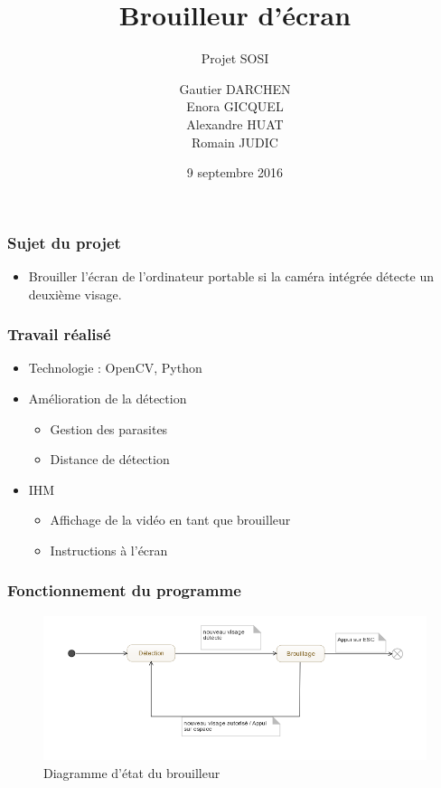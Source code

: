 \documentclass{beamer}
\title[Brouilleur d'écran (Projet SOSI)]{Brouilleur d'écran}
\subtitle{Projet SOSI}
\author[GD \-- EG \-- AH \-- RJ (ASI4)]{Gautier DARCHEN \\ Enora GICQUEL \\ Alexandre HUAT \\ Romain JUDIC}
\institute[]{INSA Rouen ASI4}
\date{9 septembre 2016}
\newif\ifplacelogo
\begin{document}
\placelogotrue	%

	\begin{frame}
	\titlepage
	\end{frame}
	
	
	\begin{frame}
	\frametitle{Sujet du projet}
	\begin{alertblock}{}
   	\rightskip=0pt\leftskip=0pt
	\begin{itemize}
	\item \og Brouiller l'écran de l'ordinateur portable si la caméra intégrée détecte un deuxième visage. \fg
	\end{itemize}
	\end{alertblock}
	\end{frame}
	
	\begin{frame}
	\frametitle{Travail réalisé}
	\begin{alertblock}{}
   	\rightskip=0pt\leftskip=0pt
	\begin{itemize}
	\item Technologie : OpenCV, Python
	\item Amélioration de la détection
		\begin{itemize} 
		\item Gestion des parasites
		\item Distance de détection
		\end{itemize}
	\item IHM 
		\begin{itemize}
		\item Affichage de la vidéo en tant que brouilleur
		\item Instructions à l'écran
		\end{itemize}
	\end{itemize}
	\end{alertblock}
	\end{frame}
	
	\begin{frame}
	\frametitle{Fonctionnement du programme}
		\begin{figure}
		\begin{center}
			\includegraphics[width=\textwidth]{diag.png}
			\caption{Diagramme d'état du brouilleur}
		\end{center}
		\end{figure}
	\end{frame}
	
\end{document}
